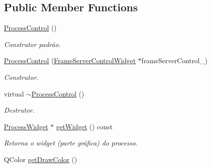 \subsection*{Public Member Functions}
\begin{DoxyCompactItemize}
\item 
\hypertarget{class_process_control_afc7ce4c99cd1dbeea91be72fe42c7e08}{}\hyperlink{class_process_control_afc7ce4c99cd1dbeea91be72fe42c7e08}{Process\+Control} ()\label{class_process_control_afc7ce4c99cd1dbeea91be72fe42c7e08}

\begin{DoxyCompactList}\small\item\em Construtor padrão. \end{DoxyCompactList}\item 
\hypertarget{class_process_control_af8adcae7adceab76734731c6dbd9b8cb}{}\hyperlink{class_process_control_af8adcae7adceab76734731c6dbd9b8cb}{Process\+Control} (\hyperlink{class_frame_server_control_widget}{Frame\+Server\+Control\+Widget} $\ast$frame\+Server\+Control\+\_\+)\label{class_process_control_af8adcae7adceab76734731c6dbd9b8cb}

\begin{DoxyCompactList}\small\item\em Construtor. \end{DoxyCompactList}\item 
\hypertarget{class_process_control_a4a778f9624d81dff33181cbaa7b2ff33}{}virtual \hyperlink{class_process_control_a4a778f9624d81dff33181cbaa7b2ff33}{$\sim$\+Process\+Control} ()\label{class_process_control_a4a778f9624d81dff33181cbaa7b2ff33}

\begin{DoxyCompactList}\small\item\em Destrutor. \end{DoxyCompactList}\item 
\hypertarget{class_process_control_a9616aa7c12793e2bdf0a661f187e6c6b}{}\hyperlink{class_process_widget}{Process\+Widget} $\ast$ \hyperlink{class_process_control_a9616aa7c12793e2bdf0a661f187e6c6b}{get\+Widget} () const \label{class_process_control_a9616aa7c12793e2bdf0a661f187e6c6b}

\begin{DoxyCompactList}\small\item\em Retorna o widget (parte gráfica) do processo. \end{DoxyCompactList}\item 
\hypertarget{class_process_control_ad4cdd61d9764dff1012e170ddd629f8f}{}Q\+Color \hyperlink{class_process_control_ad4cdd61d9764dff1012e170ddd629f8f}{get\+Draw\+Color} ()\label{class_process_control_ad4cdd61d9764dff1012e170ddd629f8f}


\end{DoxyCompactItemize}
